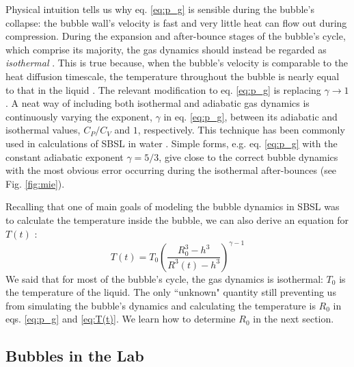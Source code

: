 \documentclass[11pt,prb,aps,nofootinbib,superscriptaddress,floatfix]{revtex4-2}
\begin{document}
Physical intuition tells us why eq. \ref{eq:p_g} is sensible during the bubble's collapse: the bubble wall's velocity is fast and very little heat can flow out during compression. During the expansion and after-bounce stages of the bubble's cycle, which comprise its majority, the gas dynamics should instead be regarded as \emph{isothermal} \cite{brenner2002single}. This is true because, when the bubble's velocity is comparable to the heat diffusion timescale, the temperature throughout the bubble is nearly equal to that in the liquid \cite{prosperetti1999old,brenner2002single,yasui2018acoustic}. The relevant modification to eq. \ref{eq:p_g} is replacing $\gamma\rightarrow 1$. A neat way of including both isothermal and adiabatic gas dynamics is continuously varying the exponent, $\gamma$ in eq. \ref{eq:p_g}, between its adiabatic and isothermal values, $C_P/C_V$ and $1$, respectively. This technique has been commonly used in calculations of SBSL in water \cite{hilgenfeldt1999simple,hilgenfeldt1999sonoluminescence,prosperetti1986bubble,brenner2002single}. Simple forms, e.g. eq. \ref{eq:p_g} with the constant adiabatic exponent $\gamma=5/3$, give close to the correct bubble dynamics with the most obvious error occurring during the isothermal after-bounces (see Fig. \ref{fig:mie}). 


Recalling that one of main goals of modeling the bubble dynamics in SBSL was to calculate the temperature inside the bubble, we can also derive an equation for $T(t)$ \cite{barber1997defining,brenner2002single,sivasubramanian2002temperature}:
\begin{equation}
    T(t) = T_0 \left( \frac{R_0^3-h^3}{R^3(t)-h^3} \right)^ {\gamma-1}
    \label{eq:T(t)}
\end{equation}
We said that for most of the bubble's cycle, the gas dynamics is isothermal: $T_0$ is the temperature of the liquid. The only ``unknown" quantity still preventing us from simulating the bubble's dynamics and calculating the temperature is $R_0$ in eqs. \ref{eq:p_g} and \ref{eq:T(t)}. We learn how to determine $R_0$ in the next section.

\subsection{Bubbles in the Lab}
\end{document}
